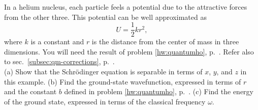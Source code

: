 In a helium nucleus, each particle feels a potential due to the attractive
forces from the other three. This potential can be well approximated as
\begin{equation*}
  U = \frac{1}{2}kr^2,
\end{equation*}
where $k$ is a constant and $r$ is the distance from the center of mass in three dimensions.
You will need the result of problem
\ref{hw:quantumho}, p.~\pageref{hw:quantumho}. Refer also to sec.~\ref{subsec:qm-corrections},
p.~\pageref{subsec:qm-corrections}. \\
(a) Show that the Schr\"odinger equation is separable in terms of $x$, $y$, and $z$ in this example.\hwendpart
(b) Find the ground-state wavefunction, expressed in terms of $r$ and the constant $b$ defined in 
problem \ref{hw:quantumho}, p.~\pageref{hw:quantumho}.\answercheck\hwendpart
(c) Find the energy of the ground state, expressed in terms of the classical frequency $\omega$.\answercheck
